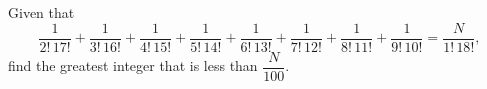 Given that
\[\dfrac1{2!\,17!}+\dfrac1{3!\,16!}+\dfrac1{4!\,15!}+\dfrac1{5!\,14!}+\dfrac1{6!\,13!}+\dfrac1{7!\,12!}+\dfrac1{8!\,11!}+\dfrac1{9!\,10!}=\dfrac{N}{1!\,18!},\]
find the greatest integer that is less than $\dfrac{N}{100}$.
